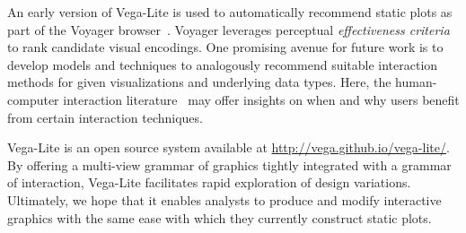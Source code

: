 An early version of Vega-Lite is used to automatically recommend static plots as
part of the Voyager browser~\cite{voyager}. Voyager leverages perceptual
\emph{effectiveness criteria}~\cite{bertin:semiology, cleveland:perception,
mackinlay:apt} to rank candidate visual encodings. One promising avenue for
future work is to develop models and techniques to analogously recommend
suitable interaction methods for given visualizations and underlying data types.
Here, the human-computer interaction literature~\cite{beaudouin:instrumental}
may offer insights on when and why users benefit from certain interaction
techniques.

Vega-Lite is an open source system available at
\url{http://vega.github.io/vega-lite/}. By offering a multi-view grammar of
graphics tightly integrated with a grammar of interaction, Vega-Lite facilitates
rapid exploration of design variations. Ultimately, we hope that it enables
analysts to produce and modify interactive graphics with the same ease with
which they currently construct static plots.